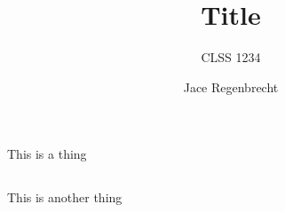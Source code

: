 \documentclass[a4paper]{scrartcl}
\title{Title}
\subtitle{CLSS 1234}
\author{Jace Regenbrecht}
\begin{document}
\maketitle

\section{}
\subsection{} 
This is a thing

\subsection{} 
This is another thing

%
%
\end{document}
